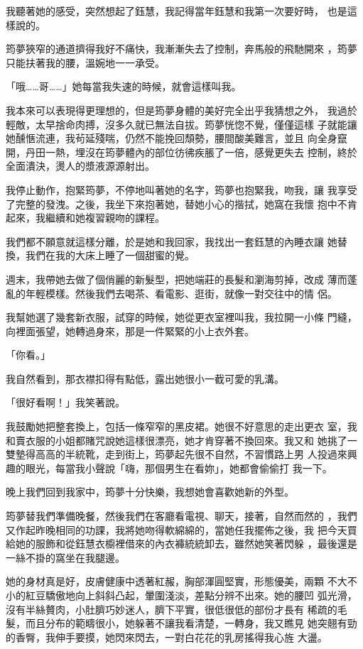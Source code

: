 我聽著她的感受，突然想起了鈺慧，我記得當年鈺慧和我第一次要好時，
也是這樣說的。

筠夢狹窄的通道擠得我好不痛快，我漸漸失去了控制，奔馬般的飛馳開來
，筠夢只能扶著我的腰，溫婉地一一承受。

「哦……哥……」她每當我失速的時候，就會這樣叫我。

我本來可以表現得更理想的，但是筠夢身體的美好完全出乎我猜想之外，
我過於輕敵，太早捨命肉搏，沒多久就已無法自拔。筠夢恍惚不覺，僅僅這樣
子就能讓她醺愜流連，我茍延殘喘，仍然不能挽回頹勢，腰間酸美難言，並且
向全身竄開，丹田一熱，埋沒在筠夢體內的部位彷彿疾脹了一倍，感覺更失去
控制，終於全面潰決，燙人的漿液源源射出。

我停止動作，抱緊筠夢，不停地叫著她的名字，筠夢也抱緊我，吻我，讓
我享受了完整的發洩。之後，我坐下來抱著她，替她小心的揩拭，她窩在我懷
抱中不肯起來，我繼續和她複習親吻的課程。

我們都不願意就這樣分離，於是她和我回家，我找出一套鈺慧的內睡衣讓
她替換，我們在我的大床上睡了一個甜蜜的覺。

週末，我帶她去做了個俏麗的新髮型，把她端莊的長髮和瀏海剪掉，改成
薄而蓬亂的年輕模樣。然後我們去喝茶、看電影、逛街，就像一對交往中的情
侶。

我幫她選了幾套新衣服，試穿的時候，她從更衣室裡叫我，我拉開一小條
門縫，向裡面張望，她轉過身來，那是一件緊緊的小上衣外套。

「你看。」

我自然看到，那衣襟扣得有點低，露出她很小一截可愛的乳溝。

「很好看啊！」我笑著說。

我鼓勵她把整套換上，包括一條窄窄的黑皮裙。她很不好意思的走出更衣
室，我和賣衣服的小姐都賭咒說她這樣很漂亮，她才肯穿著不換回來。我又和
她挑了一雙墊得高高的半統靴，走到街上，筠夢起先很不自然，不習慣路上男
人投過來興趣的眼光，每當我小聲說「嗨，那個男生在看妳」，她都會偷偷打
我一下。

晚上我們回到我家中，筠夢十分快樂，我想她會喜歡她新的外型。

筠夢替我們準備晚餐，然後我們在客廳看電視、聊天，接著，自然而然的
，我們又作起昨晚相同的功課，我將她吻得軟綿綿的，當她任我擺佈之後，我
把今天買給她的服飾和從鈺慧衣櫥裡借來的內衣褲統統卸去，雖然她笑著閃躲
，最後還是一絲不掛的窩坐在我腿邊。

她的身材真是好，皮膚健康中透著紅赧，胸部渾圓堅實，形態優美，兩顆
不大不小的紅豆驕傲地向上斜斜凸起，暈圍淺淡，差點分辨不出來。她的腰凹
弧光滑，沒有半絲贅肉，小肚臍巧妙迷人，臍下平實，很低很低的部份才長有
稀疏的毛髮，而且分布的範疇很小，她躲著不讓我看清楚，一轉身，我又瞧見
她突翹有勁的香臀，我伸手要摸，她閃來閃去，一對白花花的乳房搖得我心旌
大盪。

